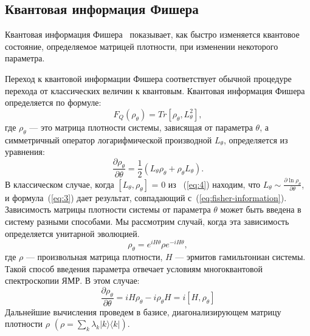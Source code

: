 \subsection{Квантовая информация Фишера}
\begin{definition}\label{def:quantum-fisher-information}
  Квантовая информация Фишера~\cite{liu2014} показывает, 
  как быстро изменяется квантовое состояние, 
  определяемое матрицей плотности, при изменении некоторого параметра. 
\end{definition}
Переход к квантовой информации Фишера соответствует обычной процедуре перехода от классических величин к квантовым. 
Квантовая информация Фишера определяется по формуле:
%
\begin{equation}
    \label{eq:3}
        F_Q (\rho_\theta) =
            Tr[\rho_\theta, L^2_\theta],
\end{equation}
%
где $\rho_\theta$ --- это матрица плотности системы, зависящая от параметра $\theta$, а симметричный оператор логарифмической производной $L_\theta$, определяется из уравнения: 
%
\begin{equation}
    \label{eq:4}
        \frac{\partial\rho_\theta}{\partial\theta} = 
            \frac{1}{2}
                \left(L_\theta \rho_\theta +
                \rho_\theta L_\theta
            \right).
\end{equation}
%
В классическом случае, когда $\left[L_\theta, \rho_\theta \right]$ = 0 из ~(\ref{eq:4}) находим, 
что ${L_\theta\sim\frac{\partial\ln\rho_\theta}{\partial\theta}}$, 
и формула~(\ref{eq:3}) дает результат, совпадающий с~(\ref{eq:fisher-information}).
%
Зависимость матрицы плотности системы от параметра $\theta$ может быть введена в систему разными способами. 
Мы рассмотрим случай, когда эта зависимость определяется унитарной эволюцией. 
%
\begin{equation}
    \label{eq:5}
        \rho_\theta = 
            e^{iH\theta}
        \rho e^{-iH\theta}, 
\end{equation}
%
где $\rho$ --- произвольная матрица плотности, $H$ --- эрмитов гамильтониан системы. 
Такой способ введения параметра отвечает условиям многоквантовой спектроскопии ЯМР. 
В этом случае: 
%
\begin{equation}
    \label{eq:6}
        \frac{\partial\rho_\theta}{\partial\theta} =
            iH\rho_\theta - i\rho_\theta H = 
        i \left[H,\rho_\theta \right]
\end{equation}
%
Дальнейшие вычисления проведем в базисе, диагонализирующем матрицу плотности $\rho$ $\left(\rho =\sum\limits_{k} \lambda_k |k\rangle  \langle k| \right)$. 
